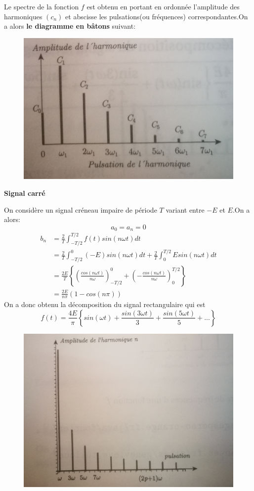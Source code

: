 \documentclass[12pt]{book}
\theoremstyle{definition}\newtheorem{dfn}{Définition}[chapter]
\theoremstyle{plain}\newtheorem{thm}{Théorème}[chapter]
\theoremstyle{plain}\newtheorem{prp}{Proposition}[chapter]
\theoremstyle{plain}\newtheorem{lem}{\bf Lemme}[chapter]
\theoremstyle{plain}\newtheorem{axm}{\bf Axiome}[chapter]
\theoremstyle{plain}\newtheorem{lmm}{\bf Lemme}[chapter]
\theoremstyle{plain}\newtheorem{cor}{\bf Corollaire}[chapter]
\theoremstyle{remark}\newtheorem{rem}{Remarque}[chapter]
\begin{document}
Le spectre de la fonction $f$ est obtenu en portant en ordonnée l'amplitude des harmoniques $(c_n)$ et abscisse les pulsations(ou fréquences) correspondantes.On a alors \textbf{le diagramme en bâtons} suivant:
\begin{figure}[H]
	\centering
	\includegraphics[scale=0.1]{Analyse de Fourier d'un signal periodique//1}
\end{figure}

\textbf{Signal carré}

On considère un signal créneau impaire de période $T$ variant entre $-E$ et $E$.On a alors:
$$
a_0=a_n=0
$$
$$
\begin{aligned}
b_n&=\frac{2}{T}\int_{-T/2}^{T/2}f(t)sin(n\omega t)dt\\
&=\frac{2}{T}\int_{-T/2}^{0}(-E)sin(n\omega t)dt+\frac{2}{T}\int_{0}^{T/2}Esin(n\omega t)dt\\
&=\frac{2E}{T}\left \{ \left(\frac{cos(n\omega t)}{n\omega}\right)_{-T/2}^0+\left(-\frac{cos(n\omega t)}{n\omega}\right)_0^{T/2} \right \} \\
&=\frac{2E}{n\pi}(1-cos(n\pi))
\end{aligned}
$$
On a donc obtenu la décomposition du signal rectangulaire qui est 
$$
\boxed{f(t)=\frac{4E}{\pi}\left \{ sin(\omega t) +\frac{sin(3\omega t)}{3}+\frac{sin(5\omega t)}{5}+...\right \} }
$$
\begin{figure}[H]
	\centering
	\includegraphics[scale=0.1]{Analyse de Fourier d'un signal periodique//2}
\end{figure}
\end{document}
